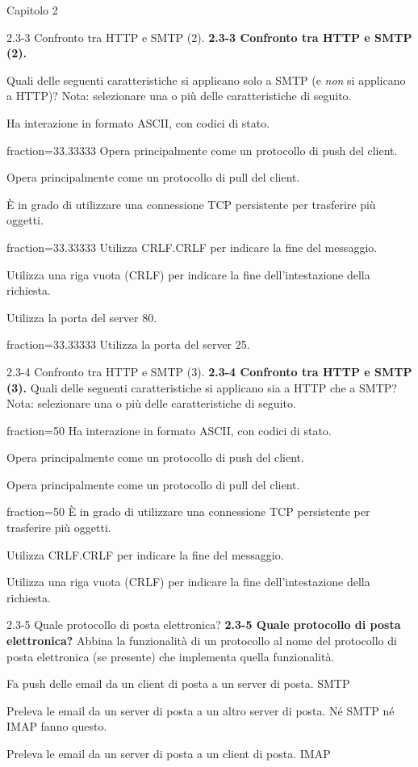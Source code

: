 \documentclass[a4paper]{article}
\begin{document}
\begin{quiz}{Capitolo 2}
\begin{multi}[points=1,shuffle,multiple]{2.3-3 Confronto tra HTTP e SMTP (2).}
\textbf{2.3-3 Confronto tra HTTP e SMTP (2).} 

Quali delle seguenti caratteristiche si applicano solo a SMTP (e \emph{non} si applicano a HTTP)?  
Nota: selezionare una o più delle caratteristiche di seguito.

\item Ha interazione in formato ASCII, con codici di stato.
\item[fraction=33.33333] Opera principalmente come un protocollo di push del client.
\item Opera principalmente come un protocollo di pull del client.
\item È in grado di utilizzare una connessione TCP persistente per trasferire più oggetti.
\item[fraction=33.33333] Utilizza CRLF.CRLF per indicare la fine del messaggio.
\item Utilizza una riga vuota (CRLF) per indicare la fine dell'intestazione della richiesta.
\item Utilizza la porta del server 80.
\item[fraction=33.33333] Utilizza la porta del server 25.
\end{multi}
    

\begin{multi}[points=1,shuffle,multiple]{2.3-4 Confronto tra HTTP e SMTP (3).}
\textbf{2.3-4 Confronto tra HTTP e SMTP (3).} 
Quali delle seguenti caratteristiche si applicano sia a HTTP che a SMTP? 
Nota: selezionare una o più delle caratteristiche di seguito.

\item[fraction=50] Ha interazione in formato ASCII, con codici di stato.
\item Opera principalmente come un protocollo di push del client.
\item Opera principalmente come un protocollo di pull del client.
\item[fraction=50] È in grado di utilizzare una connessione TCP persistente per trasferire più oggetti.
\item Utilizza CRLF.CRLF per indicare la fine del messaggio.
\item Utilizza una riga vuota (CRLF) per indicare la fine dell'intestazione della richiesta.
\end{multi}

\begin{matching}[points=1,shuffle]{2.3-5 Quale protocollo di posta elettronica?}
\textbf{2.3-5 Quale protocollo di posta elettronica?}  
Abbina la funzionalità di un protocollo al nome del protocollo di posta elettronica (se presente) che implementa quella funzionalità.
\item Fa push delle email da un client di posta a un server di posta. \answer SMTP
\item Preleva le email da un server di posta a un altro server di posta. \answer Né SMTP né IMAP fanno questo.
\item Preleva le email da un server di posta a un client di posta. \answer IMAP
\end{matching}
    

\end{quiz}
\end{document}
